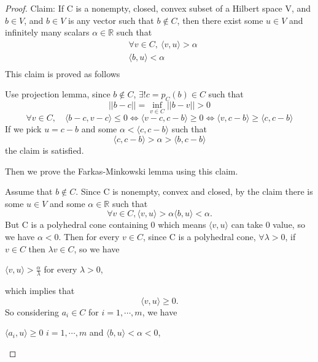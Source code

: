 \documentclass[a4paper]{report}
\begin{document}
\begin{proof}
    Claim: If C is a nonempty, closed, convex subset of a Hilbert space V, and $b\in V$, and $b\in V$ is any vector such that $b\notin C$, then there exist some $u\in V$ and infinitely many scalars $\alpha\in \mathbb R$ such that
    \begin{align*}
        &\forall v\in C, \ \langle v,u\rangle >\alpha \\
        &\langle b,u\rangle <\alpha \\
    \end{align*}
    This claim is proved as follows

    Use projection lemma, since $b\notin C$, $\exists! c=p_C(b)\in C$ such that
    \[
        ||b-c||=\inf_{v\in C} || b-v|| >0
    \]
    \[
        \forall v\in C, \quad \langle b-c,v-c \rangle \leq 0 \Leftrightarrow \langle v-c,c-b\rangle \geq 0 \Leftrightarrow \langle v,c-b\rangle\geq\langle c,c-b\rangle
    \]
    If we pick $u=c-b$ and some $\alpha<\langle c,c-b\rangle$ such that
    \[
        \langle c,c-b\rangle>\alpha>\langle b,c-b\rangle
    \]
    the claim is satisfied.

    Then we prove the Farkas-Minkowski lemma using this claim.

    Assume that $b\notin C$. Since C is nonempty, convex and closed, by the claim there is some $u\in V$ and some $\alpha\in \mathbb R$ such that
    \[
        \forall v\in C, \langle v,u \rangle >\alpha
        \langle b,u\rangle <\alpha.
    \]
    But C is a polyhedral cone containing 0 which means $\langle v,u\rangle$ can take 0 value, so we have $\alpha<0$. Then for every $v\in C$, since C is a polyhedral cone, $\forall \lambda >0$, if $v\in C$ then $\lambda v\in C$, so we have
    \begin{center}
        $\langle v,u\rangle >\frac{\alpha}{\lambda}$ for every $\lambda>0$,
    \end{center}
    which implies that
    \[
        \langle v,u\rangle\geq 0.
    \]
    So considering $a_i\in C$ for $i=1,\cdots,m$, we have 
    \begin{center}
        $\langle a_i,u\rangle \geq 0$ $i=1,\cdots,m$ and $\langle b,u\rangle <\alpha<0$,
    \end{center}
\end{proof}
\end{document}
